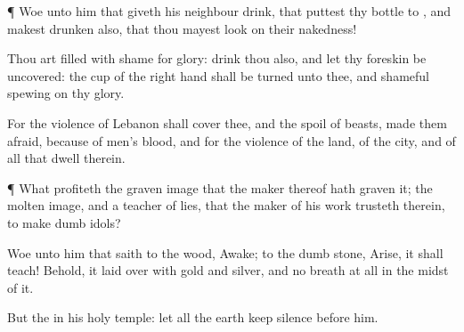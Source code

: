 {\par }{\PP {}¶
Woe unto him that giveth his
neighbour
drink, that
puttest thy
bottle to
{}, and makest
{}
drunken also, that thou mayest
look on their
nakedness!

Thou art
filled with
shame for
glory:
drink thou also, and let thy foreskin be
uncovered: the
cup of the
{} right
hand shall be
turned unto thee, and shameful
spewing
{} on thy
glory.

For the
violence of
Lebanon shall
cover thee, and the
spoil of
beasts,
{} made them
afraid, because of
men’s
blood, and for the
violence of the
land, of the
city, and of all that
dwell therein.


\par }{\PP {}¶ What
profiteth the graven
image that the
maker thereof hath
graven it; the molten
image, and a
teacher of
lies, that the
maker of his
work
trusteth therein, to
make
dumb
idols?

Woe unto him that
saith to the
wood,
Awake; to the
dumb
stone,
Arise, it shall
teach! Behold, it
{}
laid over with
gold and
silver, and
{} no
breath at all in the
midst of it.

But the
{}
{} in his
holy
temple: let all the
earth keep
silence
before him.




\par }
